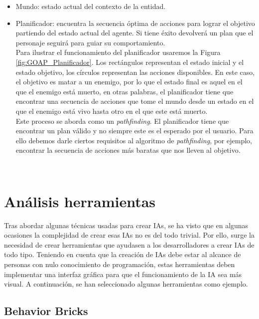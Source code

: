 \begin{itemize}
	\item Mundo: estado actual del contexto de la entidad.
 	
	\item Planificador: encuentra la secuencia óptima de acciones para lograr el objetivo partiendo del estado actual del agente. Si tiene éxito devolverá un plan que el personaje seguirá para guiar su comportamiento.\\
Para ilustrar el funcionamiento del planificador usaremos la Figura \ref{fig:GOAP_Planificador}.
Los rectángulos representan el estado inicial y el estado objetivo, los círculos representan las acciones disponibles.
En este caso, el objetivo es matar a un enemigo, por lo que el estado final es aquel en el que el enemigo está muerto, en otras palabras, el planificador tiene que encontrar una secuencia de acciones que tome el mundo desde un estado en el que el enemigo está vivo hasta otro en el que este está muerto.\\
Este proceso se aborda como un \textit{pathfinding}. El planificador tiene que encontrar un plan válido y no siempre este es el esperado por el usuario. Para ello debemos darle ciertos requisitos al algoritmo de \textit{pathfinding}, por ejemplo, encontrar la secuencia de acciones más baratas que nos lleven al objetivo.


	
	
\end{itemize}
\\ 
\section{Análisis herramientas}

Tras abordar algunas técnicas usadas para crear IAs, se ha visto que en algunas ocasiones la complejidad de crear esas IAs no es del todo trivial. Por ello, surge la necesidad de crear herramientas que ayudasen a los desarrolladores a crear IAs de todo tipo. Teniendo en cuenta que la creación de IAs debe estar al alcance de personas con nulo conocimiento de programación, estas herramientas deben implementar una interfaz gráfica para que el funcionamiento de la IA sea más visual.
A continuación, se han seleccionado algunas herramientas como ejemplo.\\

\subsection{Behavior Bricks}

